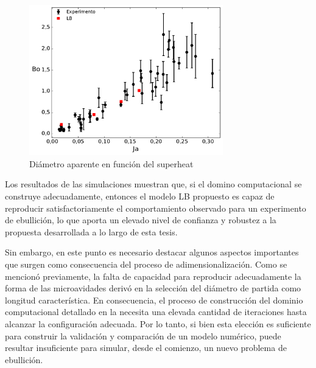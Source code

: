 \begin{figure}[ht]
	\centering
	\includegraphics[width=0.75\textwidth]{Imagenes/FC72/Bo_vs_Ja/Bo_vs_Ja}
	\caption{Di\'ametro aparente en funci\'on del superheat}
	\label{fig:Bo_vs_Ja}
\end{figure}
\FloatBarrier


Los resultados de las simulaciones muestran que, si el domino computacional se construye adecuadamente, entonces el modelo LB propuesto es capaz de reproducir satisfactoriamente el comportamiento observado para un experimento de ebullici\'on, lo que aporta un elevado nivel de confianza y robustez a la propuesta desarrollada a lo largo de esta tesis. 

Sin embargo, en este punto es necesario destacar algunos aspectos importantes que surgen como consecuencia del proceso de adimensionalizaci\'on. Como se mencion\'o previamente, la falta de capacidad para reproducir adecuadamente la forma de las microavidades deriv\'o en la selecci\'on del di\'ametro de partida como longitud caracter\'istica. En consecuencia, el proceso de construcci\'on del dominio computacional detallado en la  necesita una elevada cantidad de iteraciones hasta alcanzar la configuraci\'on adecuada. Por lo tanto, si bien esta elecci\'on es suficiente para construir la validaci\'on y comparaci\'on de un modelo num\'erico, puede resultar insuficiente para simular, desde el comienzo, un nuevo problema de ebullici\'on.

